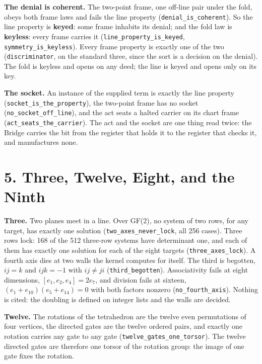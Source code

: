 \documentclass[10pt,twocolumn]{article}
\begin{document}
\textbf{The denial is coherent.} The two-point frame, one off-line pair
under the fold, obeys both frame laws and fails the line property
(\texttt{denial\_\allowbreak{}is\_\allowbreak{}coherent}). So the line property is \textbf{keyed}:
some frame inhabits its denial; and the fold law is \textbf{keyless}:
every frame carries it (\texttt{line\_\allowbreak{}property\_\allowbreak{}is\_\allowbreak{}keyed},
\texttt{symmetry\_\allowbreak{}is\_\allowbreak{}keyless}). Every frame property is exactly one of
the two (\texttt{discriminator}, on the standard three, since the sort
is a decision on the denial). The fold is keyless and opens on any deed;
the line is keyed and opens only on its key.

\textbf{The socket.} An instance of the supplied term is exactly the
line property (\texttt{socket\_\allowbreak{}is\_\allowbreak{}the\_\allowbreak{}property}), the two-point frame
has no socket (\texttt{no\_\allowbreak{}socket\_\allowbreak{}off\_\allowbreak{}line}), and the act seats a
halted carrier on its chart frame (\texttt{act\_\allowbreak{}seats\_\allowbreak{}the\_\allowbreak{}carrier}).
The act and the socket are one thing read twice: the Bridge carries the
bit from the register that holds it to the register that checks it, and
manufactures none.

\hypertarget{three-twelve-eight-and-the-ninth}{%
\section{5. Three, Twelve, Eight, and the
Ninth}\label{three-twelve-eight-and-the-ninth}}

\textbf{Three.} Two planes meet in a line. Over GF(2), no system of two
rows, for any target, has exactly one solution
(\texttt{two\_\allowbreak{}axes\_\allowbreak{}never\_\allowbreak{}lock}, all 256 cases). Three rows lock: 168
of the 512 three-row systems have determinant one, and each of them has
exactly one solution for each of the eight targets
(\texttt{three\_\allowbreak{}axes\_\allowbreak{}lock}). A fourth axis dies at two walls the kernel
computes for itself. The third is begotten, \(ij=k\) and \(ijk=-1\) with
\(ij\ne ji\) (\texttt{third\_\allowbreak{}begotten}). Associativity fails at eight
dimensions, \([e_1,e_2,e_4]=2e_7\), and division fails at sixteen,
\((e_1+e_{10})(e_5+e_{14})=0\) with both factors nonzero
(\texttt{no\_\allowbreak{}fourth\_\allowbreak{}axis}). Nothing is cited: the doubling is defined
on integer lists and the walls are decided.

\textbf{Twelve.} The rotations of the tetrahedron are the twelve even
permutations of four vertices, the directed gates are the twelve ordered
pairs, and exactly one rotation carries any gate to any gate
(\texttt{twelve\_\allowbreak{}gates\_\allowbreak{}one\_\allowbreak{}torsor}). The twelve directed gates are
therefore one torsor of the rotation group: the image of one gate fixes
the rotation.
\end{document}
